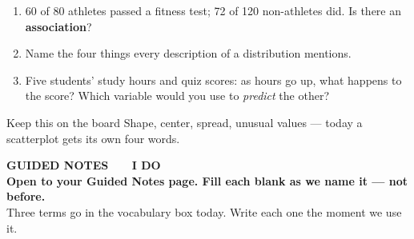 \documentclass[aspectratio=169, 11pt]{beamer}
\begin{document}
\begin{frame}[t, plain]
  \begin{enumerate}\setlength{\itemsep}{7pt}
    \item 60 of 80 athletes passed a fitness test; 72 of 120 non-athletes did. Is there an
          \textbf{association}?
    \item Name the four things every description of a distribution mentions.
    \item Five students' study hours and quiz scores: as hours go up, what happens to the
          score? Which variable would you use to \emph{predict} the other?
  \end{enumerate}
  \begin{block}{Keep this on the board}
    Shape, center, spread, unusual values --- today a scatterplot gets its own four words.
  \end{block}
\end{frame}

{
\begin{frame}[plain]
  \vspace{1.8cm}\hspace{0.8cm}%
  \begin{minipage}{0.86\textwidth}
    {\color{goldacc}\bfseries\small GUIDED NOTES \ \textbullet\ \ I DO}\\[0.7cm]
    {\color{white}\bfseries\Large Open to your Guided Notes page. Fill each blank as we
    name it --- not before.}\\[0.9cm]
    {\color{skymid}\small Three terms go in the vocabulary box today. Write each one the
    moment we use it.}
  \end{minipage}
\end{frame}
}
\end{document}
